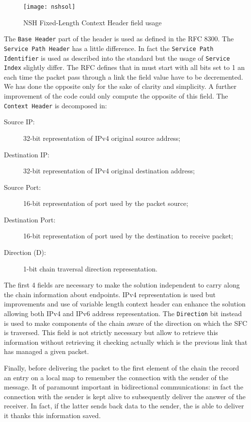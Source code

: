 \begin{figure}
  \centering \texttt{[image: nshsol]}
  \caption{NSH Fixed-Length Context Header field usage}
  \label{chap:impl:img:nsh}
\end{figure}

The \texttt{Base Header} part of the header is used as defined in the RFC 8300.
The \texttt{Service Path Header} has a little difference. In fact the 
\texttt{Service Path Identifier} is used as described into the standard but the
usage of \texttt{Service Index} slightly differ. The RFC defines that in must
start with all bits set to 1 an each time the packet pass through a link the
field value have to be decremented. We has done the opposite only for the sake
of clarity and simplicity. A further improvement of the code could only compute
the opposite of this field. The \texttt{Context Header} is decomposed in:
\begin{description}
  \item[Source IP:] 32-bit representation of IPv4 original source address;
  \item[Destination IP:] 32-bit representation of IPv4 original destination
  address;
  \item[Source Port:] 16-bit representation of port used by the packet source;
  \item[Destination Port:] 16-bit representation of port used by the destination
  to receive packet;
  \item[Direction (D):] 1-bit chain traversal direction representation.
\end{description}
The first 4 fields are necessary to make the solution independent to carry along
the chain information about endpoints. IPv4 representation is used but
improvements and use of variable length context header can enhance the
solution allowing both IPv4 and IPv6 address representation. The 
\texttt{Direction} bit instead is used to make components of the chain aware of
the direction on which the SFC is traversed. This field is not strictly
necessary but allow to retrieve this information without retrieving it checking
actually which is the previous link that has managed a given packet. 

Finally, before delivering the packet to the first element of the chain the
\ingress{} record an entry on a local map to remember the connection with
the sender of the message. It of paramount important in bidirectional
communications: in fact the connection with the sender is kept alive to
subsequently deliver the answer of the receiver. In fact, if the latter sends
back data to the sender, the \ingress{} is able to deliver it thanks this
information saved.

